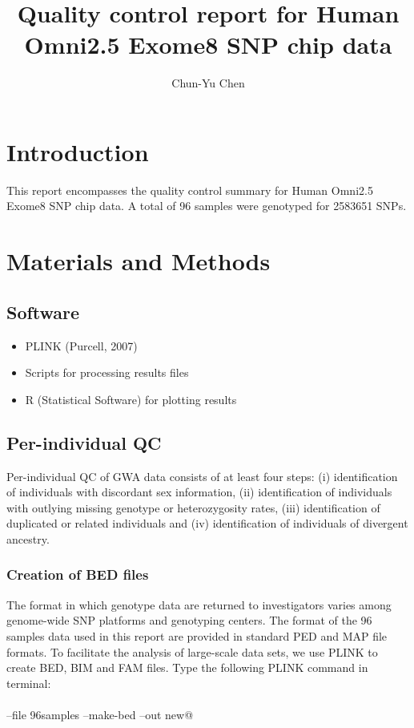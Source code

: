 \documentclass{article}\usepackage[]{graphicx}\usepackage[]{color}
\title{Quality control report for Human Omni2.5 Exome8 SNP chip data}
\author{Chun-Yu Chen}
\begin{document}
\maketitle
\tableofcontents
\newpage
\section{Introduction}
This report encompasses the quality control summary for Human Omni2.5 Exome8 SNP chip data. A total of 96 samples were genotyped for 2583651 SNPs. 
\section{Materials and Methods}
\subsection{Software}
\begin{itemize}
    \item PLINK (Purcell, 2007)
    \item Scripts for processing results files
    \item R (Statistical Software) for plotting results
\end{itemize}
\subsection{Per-individual QC}
Per-individual QC of GWA data consists of at least four steps: (i) identification of individuals with discordant sex information, (ii) identification of individuals with outlying missing genotype or heterozygosity rates, (iii) identification of duplicated or related individuals and (iv) identification of individuals of divergent ancestry.
\subsubsection{Creation of BED files}
The format in which genotype data are returned to investigators varies among genome-wide SNP platforms and genotyping centers. The format of the 96 samples data used in this report are provided in standard PED and MAP file formats. To facilitate the analysis of large-scale data sets, we use PLINK to create BED, BIM and FAM files. Type the following PLINK command in terminal:
\\\\\verb@plink --file 96samples --make-bed --out new@
\end{document}
